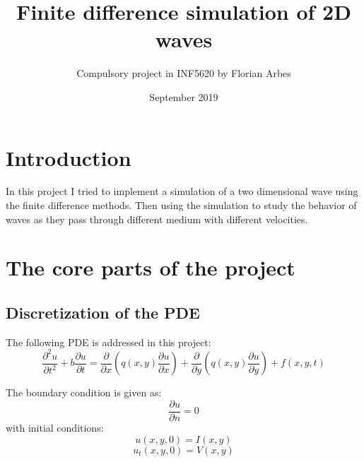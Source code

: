 \documentclass{report}
\title{Finite difference simulation of 2D waves}
\author{Compulsory project in INF5620 by Florian Arbes}
\date{September 2019}
\begin{document}
\maketitle

    \chapter*{Introduction}
        In this project I tried to implement a simulation of a two dimensional wave using the finite difference methods. Then using the simulation to study the behavior of waves as they pass through different medium with different velocities. 
        
        
    \chapter*{The core parts of the project}
    
    \section*{Discretization of the PDE}
    
        The following PDE is addressed in this project:
        \begin{equation} \label{eq:1}
            \frac{\partial^2 u}{\partial t^2} + b\frac{\partial u}{\partial t} = \frac{\partial}{\partial x}(q(x, y)\frac{\partial u}{\partial x}) + \frac{\partial}{\partial y}(q(x, y)\frac{\partial u}{\partial y}) + f(x, y, t)
        \end{equation}
        
        The boundary condition is given as:
        \begin{equation}
            \frac{\partial u}{\partial n} = 0
        \end{equation}
        with initial conditions:
        \begin{equation}
            u(x, y, 0) = I(x, y)
        \end{equation}
        \begin{equation}
            u_t(x, y, 0) = V(x, y)
        \end{equation}
        \newpage
        
\end{document}
